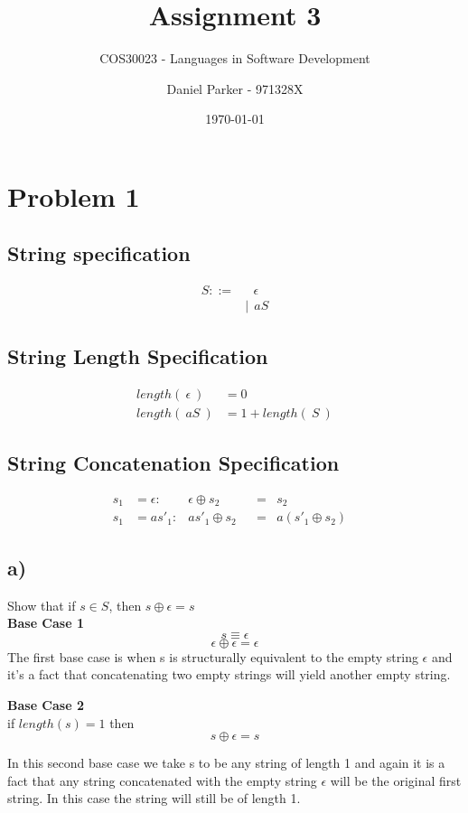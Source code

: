 \documentclass[11pt, numbers=endperiod, parskip=half]{scrartcl}
\title{Assignment 3}
\subtitle{COS30023 - Languages in Software Development}
\author{Daniel Parker - 971328X}
\date{\today}
\begin{document}
\maketitle

\section{Problem 1}
\subsection{String specification}
\begin{align*}
S ::=& \ \ \ \epsilon \\
&|\ \ aS
\end{align*}
\subsection{String Length Specification}

\begin{align*}
length(\ \epsilon\ ) &= 0 \\
length(\ aS\ ) &= 1 + length(\ S\ )
\end{align*}

\subsection{String Concatenation Specification}
\begin{align*}
s_1 &= \epsilon: & \epsilon \oplus s_2 & &= &s_2 &\\
s_1 &= as'_1: & as'_1 \oplus s_2 & &= &a(s'_1 \oplus s_2)
\end{align*}
\clearpage
\subsection{a)}
Show that if \(s \in S\), then \(s \oplus \epsilon = s\)\\
\textbf{Base Case 1}\\
\[
s \equiv \epsilon
\]
\[
\epsilon \oplus \epsilon = \epsilon
\]
The first base case is when s is structurally equivalent to the empty string \(\epsilon\) and it's a fact that concatenating two empty strings will yield another empty string.

\textbf{Base Case 2}\\
if \(length(s) = 1\) then
\[
s \oplus \epsilon = s
\]

In this second base case we take s to be any string of length 1 and again it is a fact that any string concatenated with the empty string \(\epsilon\) will be the original first string. In this case the string will still be of length 1.
\end{document}
